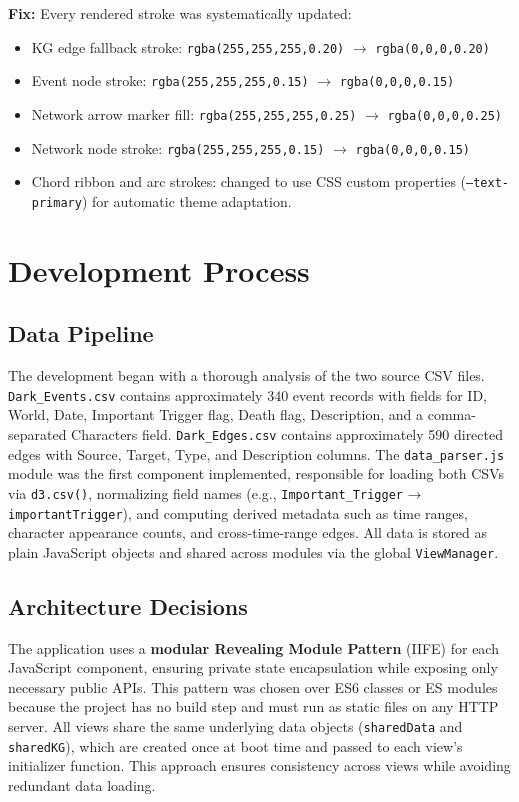 \documentclass[11pt,a4paper]{article}
\begin{document}
\textbf{Fix:} Every rendered stroke was systematically updated:
\begin{itemize}[nosep]
    \item KG edge fallback stroke: \texttt{rgba(255,255,255,0.20)} $\rightarrow$ \texttt{rgba(0,0,0,0.20)}
    \item Event node stroke: \texttt{rgba(255,255,255,0.15)} $\rightarrow$ \texttt{rgba(0,0,0,0.15)}
    \item Network arrow marker fill: \texttt{rgba(255,255,255,0.25)} $\rightarrow$ \texttt{rgba(0,0,0,0.25)}
    \item Network node stroke: \texttt{rgba(255,255,255,0.15)} $\rightarrow$ \texttt{rgba(0,0,0,0.15)}
    \item Chord ribbon and arc strokes: changed to use CSS custom properties (\texttt{--text-primary}) for automatic theme adaptation.
\end{itemize}

\section{Development Process}

\subsection{Data Pipeline}
The development began with a thorough analysis of the two source CSV files. \texttt{Dark\_Events.csv} contains approximately 340 event records with fields for ID, World, Date, Important Trigger flag, Death flag, Description, and a comma-separated Characters field. \texttt{Dark\_Edges.csv} contains approximately 590 directed edges with Source, Target, Type, and Description columns. The \texttt{data\_parser.js} module was the first component implemented, responsible for loading both CSVs via \texttt{d3.csv()}, normalizing field names (e.g., \texttt{Important\_Trigger} → \texttt{importantTrigger}), and computing derived metadata such as time ranges, character appearance counts, and cross-time-range edges. All data is stored as plain JavaScript objects and shared across modules via the global \texttt{ViewManager}.

\subsection{Architecture Decisions}
The application uses a \textbf{modular Revealing Module Pattern} (IIFE) for each JavaScript component, ensuring private state encapsulation while exposing only necessary public APIs. This pattern was chosen over ES6 classes or ES modules because the project has no build step and must run as static files on any HTTP server. All views share the same underlying data objects (\texttt{sharedData} and \texttt{sharedKG}), which are created once at boot time and passed to each view's initializer function. This approach ensures consistency across views while avoiding redundant data loading.
\end{document}
